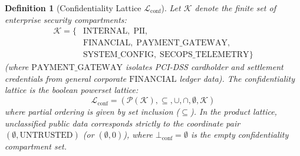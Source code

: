 \documentclass[conference,10pt]{IEEEtran}
\newtheorem{definition}{Definition}
\begin{document}
\begin{definition}[Confidentiality Lattice $\mathcal{L}_{\text{conf}}$]
Let $\mathcal{K}$ denote the finite set of enterprise security compartments:
\begin{equation}
\begin{split}
\mathcal{K} = \big\{ &\text{INTERNAL}, \; \text{PII}, \\
&\text{FINANCIAL}, \; \text{PAYMENT\_GATEWAY}, \\
&\text{SYSTEM\_CONFIG}, \; \text{SECOPS\_TELEMETRY} \big\}
\end{split}
\end{equation}
(where $\text{PAYMENT\_GATEWAY}$ isolates PCI-DSS cardholder and settlement credentials from general corporate $\text{FINANCIAL}$ ledger data). The confidentiality lattice is the boolean powerset lattice:
\begin{equation}
\mathcal{L}_{\text{conf}} = (\mathcal{P}(\mathcal{K}), \subseteq, \cup, \cap, \emptyset, \mathcal{K})
\end{equation}
where partial ordering is given by set inclusion ($\subseteq$). In the product lattice, unclassified public data corresponds strictly to the coordinate pair $(\emptyset, \text{UNTRUSTED})$ (or $(\emptyset, 0)$), where $\bot_{\text{conf}} = \emptyset$ is the empty confidentiality compartment set.
\end{definition}
\end{document}
